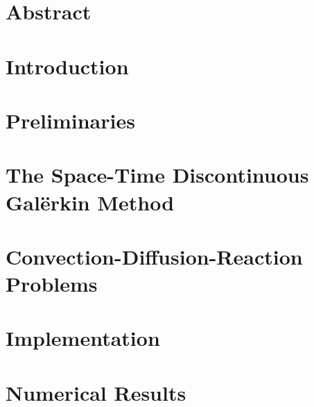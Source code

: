 
\chapter*{Abstract}




\newpage
\tableofcontents
\thispagestyle{plain}



\newpage
\chapter{Introduction} \label{chapter:introduction}





\newpage
\chapter{Preliminaries} \label{chapter:preliminaries}




\newpage
\chapter{The Space-Time Discontinuous Galërkin Method} \label{chapter:dg}




\newpage
\chapter{Convection-Diffusion-Reaction Problems} \label{chapter:cdr}




\newpage
\chapter{Implementation} \label{chapter:implementation}




\newpage
\chapter{Numerical Results} \label{chapter:results}

